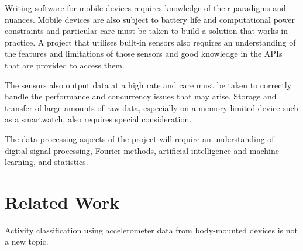     Writing software for mobile devices requires knowledge of their paradigms and nuances.
    Mobile devices are also subject to battery life and computational power constraints and   
    particular care must be taken to build a solution that works in practice.  
    A project that utilises built-in sensors also requires an understanding of the features and 
    limitations of those sensors and good knowledge in the APIs that are provided to access them.

    The sensors also output data at a high rate and care must be taken to correctly handle the
    performance and concurrency issues that may arise. Storage and transfer of large amounts of
    raw data, especially on a memory-limited device such as a smartwatch, also requires special
    consideration. 
    
    The data processing aspects of the project will require an understanding of digital signal 
    processing, Fourier methods, artificial intelligence and machine learning, and statistics.
  
  \section{Related Work}
  \label{sec:intro-relatedwork}
    Activity classification using accelerometer data from body-mounted devices is not a new topic.
